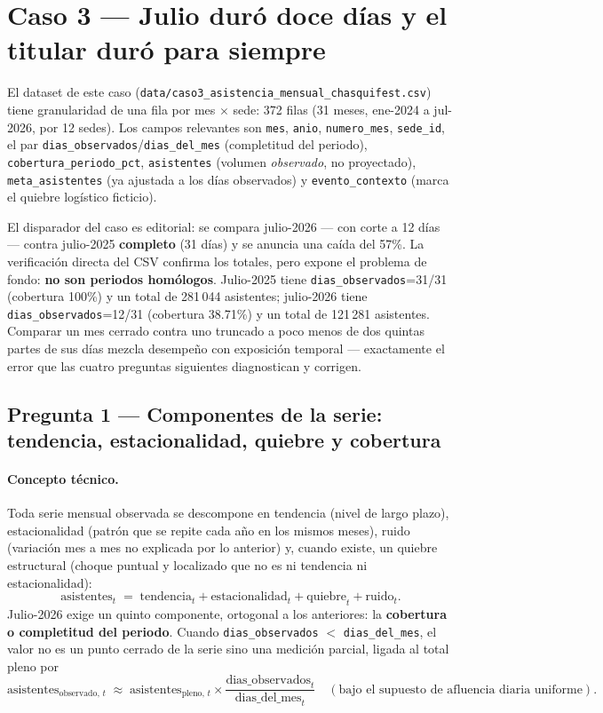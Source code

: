 \section{Caso 3 --- Julio duró doce días y el titular duró para siempre}
\label{sec:caso3}

El dataset de este caso (\texttt{data/caso3\_asistencia\_mensual\_chasquifest.csv}) tiene granularidad de una fila por mes $\times$ sede: 372 filas (31 meses, ene-2024 a jul-2026, por 12 sedes). Los campos relevantes son \texttt{mes}, \texttt{anio}, \texttt{numero\_mes}, \texttt{sede\_id}, el par \texttt{dias\_observados}/\texttt{dias\_del\_mes} (completitud del periodo), \texttt{cobertura\_periodo\_pct}, \texttt{asistentes} (volumen \emph{observado}, no proyectado), \texttt{meta\_asistentes} (ya ajustada a los días observados) y \texttt{evento\_contexto} (marca el quiebre logístico ficticio).

El disparador del caso es editorial: se compara julio-2026 --- con corte a 12 días --- contra julio-2025 \textbf{completo} (31 días) y se anuncia una caída del 57\%. La verificación directa del CSV confirma los totales, pero expone el problema de fondo: \textbf{no son periodos homólogos}. Julio-2025 tiene \texttt{dias\_observados}=31/31 (cobertura 100\%) y un total de 281\,044 asistentes; julio-2026 tiene \texttt{dias\_observados}=12/31 (cobertura 38.71\%) y un total de 121\,281 asistentes. Comparar un mes cerrado contra uno truncado a poco menos de dos quintas partes de sus días mezcla desempeño con exposición temporal --- exactamente el error que las cuatro preguntas siguientes diagnostican y corrigen.

\subsection{Pregunta 1 --- Componentes de la serie: tendencia, estacionalidad, quiebre y cobertura}
\label{ssec:c3-q1}

\paragraph{Concepto técnico.}
Toda serie mensual observada se descompone en tendencia (nivel de largo plazo), estacionalidad (patrón que se repite cada año en los mismos meses), ruido (variación mes a mes no explicada por lo anterior) y, cuando existe, un quiebre estructural (choque puntual y localizado que no es ni tendencia ni estacionalidad):
\[
\text{asistentes}_t \;=\; \text{tendencia}_t + \text{estacionalidad}_t + \text{quiebre}_t + \text{ruido}_t .
\]
Julio-2026 exige un quinto componente, ortogonal a los anteriores: la \textbf{cobertura o completitud del periodo}. Cuando \texttt{dias\_observados} $<$ \texttt{dias\_del\_mes}, el valor no es un punto cerrado de la serie sino una medición parcial, ligada al total pleno por
\[
\text{asistentes}_{\text{observado},\,t} \;\approx\; \text{asistentes}_{\text{pleno},\,t}\times\frac{\text{dias\_observados}_t}{\text{dias\_del\_mes}_t}\quad(\text{bajo el supuesto de afluencia diaria uniforme}).
\]

